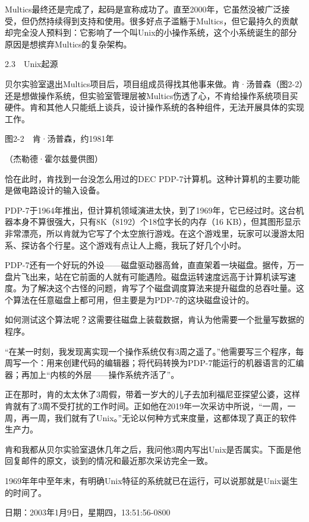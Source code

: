 \documentclass[a4paper,12pt,UTF8,twoside]{ctexbook}
\begin{document}
{Multics最终还是完成了，起码是宣称成功了。直至2000年，它虽然没被广泛接受，但仍然持续得到支持和使用。很多好点子滥觞于Multics，但它最持久的贡献却完全没人预料到：它影响了一个叫Unix的小操作系统，这个小系统诞生的部分原因是想摈弃Multics的复杂架构。





2.3　Unix起源


贝尔实验室退出Multics项目后，项目组成员得找其他事来做。肯·汤普森（图2-2）还是想做操作系统，但实验室管理层被Multics伤透了心，不肯给操作系统项目买硬件。肯和其他人只能纸上谈兵，设计操作系统的各种组件，无法开展具体的实现工作。



图2-2　肯·汤普森，约1981年

（杰勒德·霍尔兹曼供图）

恰在此时，肯找到一台没怎么用过的DEC PDP-7计算机。这种计算机的主要功能是做电路设计的输入设备。

PDP-7于1964年推出，但计算机领域演进太快，到了1969年，它已经过时。这台机器本身不算很强大，只有8K（8192）个18位字长的内存（16 KB），但其图形显示非常漂亮，所以肯就为它写了个太空旅行游戏。在这个游戏里，玩家可以漫游太阳系、探访各个行星。这个游戏有点让人上瘾，我玩了好几个小时。

PDP-7还有一个好玩的外设——磁盘驱动器高耸，直直架着一块磁盘。据传，万一盘片飞出来，站在它前面的人就有可能遇险。磁盘运转速度远高于计算机读写速度。为了解决这个古怪的问题，肯写了个磁盘调度算法来提升磁盘的总吞吐量。这个算法在任意磁盘上都可用，但主要是为PDP-7的这块磁盘设计的。

如何测试这个算法呢？这需要往磁盘上装载数据，肯认为他需要一个批量写数据的程序。

“在某一时刻，我发现离实现一个操作系统仅有3周之遥了。”他需要写三个程序，每周写一个：用来创建代码的编辑器；将代码转换为PDP-7能运行的机器语言的汇编器；再加上“内核的外层——操作系统齐活了”。

正在那时，肯的太太休了3周假，带着一岁大的儿子去加利福尼亚探望公婆，这样肯就有了3周不受打扰的工作时间。正如他在2019年一次采访中所说，“一周，一周，再一周，我们就有了Unix。”无论以何种方式来度量，这都体现了真正的软件生产力。

肯和我都从贝尔实验室退休几年之后，我问他3周内写出Unix是否属实。下面是他回复邮件的原文，谈到的情况和最近那次采访完全一致。

1969年年中至年末，有明确Unix特征的系统就已在运行，可以说那就是Unix诞生的时间了。



日期：2003年1月9日，星期四，13:51:56-0800

}
\end{document}
